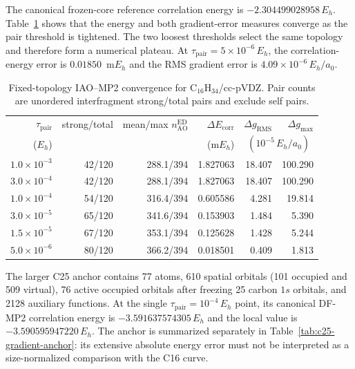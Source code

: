 \documentclass[11pt]{article}
\begin{document}
The canonical frozen-core reference correlation energy is
$-2.304499028958\,E_h$.  Table~\ref{tab:c16-gradient-convergence} shows that
the energy and both gradient-error measures converge as the pair threshold is
tightened.  The two loosest thresholds select the same topology and therefore
form a numerical plateau.  At $\tau_{\mathrm{pair}}=5\times10^{-6}\,E_h$,
the correlation-energy error is $0.01850$~m$E_h$ and the RMS gradient error is
$4.09\times10^{-6}\,E_h/a_0$.

\begin{table}[htbp]
 \centering
 \caption{Fixed-topology IAO--MP2 convergence for
 $\mathrm{C}_{16}\mathrm{H}_{34}$/cc-pVDZ.  Pair counts are unordered
 interfragment strong/total pairs and exclude self pairs.}
 \label{tab:c16-gradient-convergence}
 \scriptsize
 \setlength{\tabcolsep}{3.2pt}
 \begin{tabular}{@{}rrrrrr@{}}
  \toprule
  $\tau_{\mathrm{pair}}$ & strong/total &
  mean/max $n_{\mathrm{AO}}^{\mathrm{ED}}$ &
  $\Delta E_{\mathrm{corr}}$ &
  $\Delta g_{\mathrm{RMS}}$ & $\Delta g_{\max}$ \\
  ($E_h$) & & & (m$E_h$) &
  \multicolumn{2}{c}{$(10^{-5}\,E_h/a_0)$} \\
  \midrule
  $1.0\times10^{-3}$ & 42/120 & 288.1/394 & 1.827063 & 18.407 & 100.290 \\
  $3.0\times10^{-4}$ & 42/120 & 288.1/394 & 1.827063 & 18.407 & 100.290 \\
  $1.0\times10^{-4}$ & 54/120 & 316.4/394 & 0.605586 & 4.281 & 19.814 \\
  $3.0\times10^{-5}$ & 65/120 & 341.6/394 & 0.153903 & 1.484 & 5.390 \\
  $1.5\times10^{-5}$ & 67/120 & 353.1/394 & 0.125628 & 1.428 & 5.244 \\
  $5.0\times10^{-6}$ & 80/120 & 366.2/394 & 0.018501 & 0.409 & 1.813 \\
  \bottomrule
 \end{tabular}
\end{table}

The larger C25 anchor contains 77 atoms, 610 spatial orbitals (101 occupied
and 509 virtual), 76 active occupied orbitals after freezing 25 carbon
$1s$ orbitals, and 2128 auxiliary functions.  At the single
$\tau_{\mathrm{pair}}=10^{-4}\,E_h$ point, its canonical DF-MP2 correlation
energy is $-3.591637574305\,E_h$ and the local value is
$-3.590595947220\,E_h$.  The anchor is summarized separately in
Table~\ref{tab:c25-gradient-anchor}: its extensive absolute energy error must
not be interpreted as a size-normalized comparison with the C16 curve.
\end{document}

